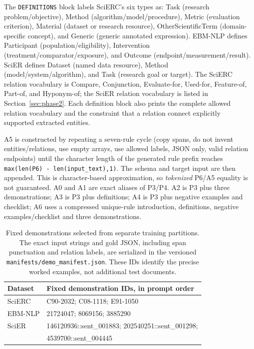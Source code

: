 \documentclass[fleqn,10pt]{wlscirep-authoryear}
\begin{document}
The \texttt{DEFINITIONS} block labels SciERC's six types as: Task (research
problem/objective), Method (algorithm/model/procedure), Metric (evaluation
criterion), Material (dataset or research resource), OtherScientificTerm
(domain-specific concept), and Generic (generic annotated expression).
EBM-NLP defines Participant (population/eligibility), Intervention
(treatment/comparator/exposure), and Outcome (endpoint/measurement/result).
SciER defines Dataset (named data resource), Method (model/system/algorithm),
and Task (research goal or target). The SciERC relation vocabulary is
Compare, Conjunction, Evaluate-for, Used-for, Feature-of, Part-of, and
Hyponym-of; the SciER relation vocabulary is listed in Section~\ref{sec:phase2}.
Each definition block also prints the complete allowed relation vocabulary and
the constraint that a relation connect explicitly supported extracted entities.

A5 is constructed by repeating a seven-rule cycle (copy spans, do not invent
entities/relations, use empty arrays, use allowed labels, JSON only, valid
relation endpoints) until the character length of the generated rule prefix
reaches \texttt{max(len(P6) - len(input\_text),1)}. The schema and target input
are then appended. This is character-based approximation, so \emph{tokenized}
P6/A5 equality is not guaranteed. A0 and A1 are exact aliases of P3/P4.
A2 is P3 plus three demonstrations; A3 is P3 plus definitions; A4 is P3
plus negative examples and checklist; A6 uses a compressed unique-rule
introduction, definitions, negative examples/checklist and three demonstrations.

\begin{table}[t]
\centering
\caption{Fixed demonstrations selected from separate training partitions.
The exact input strings and gold JSON, including span punctuation and relation
labels, are serialized in the versioned \texttt{manifests/demo\_manifest.json}.
These IDs identify the precise worked examples, not additional test documents.}
\label{tab:demo-ids}
\begin{tabular}{ll}
\toprule
Dataset & Fixed demonstration IDs, in prompt order \\
\midrule
SciERC & C90-2032; C08-1118; E91-1050 \\
EBM-NLP & 21724047; 8069156; 3885290 \\
SciER & 146120936::sent\_001883; 202540251::sent\_001298; \\
      & 4539700::sent\_004445 \\
\bottomrule
\end{tabular}
\end{table}
\end{document}
